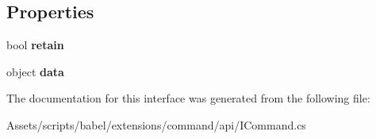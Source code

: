 \subsection*{Properties}
\begin{DoxyCompactItemize}
\item 
\hypertarget{interfacebabel_1_1extensions_1_1command_1_1api_1_1_i_command_a2ff6a94dcc8af6d3b35b7731041ae9e4}{bool {\bfseries retain}}\label{interfacebabel_1_1extensions_1_1command_1_1api_1_1_i_command_a2ff6a94dcc8af6d3b35b7731041ae9e4}

\item 
\hypertarget{interfacebabel_1_1extensions_1_1command_1_1api_1_1_i_command_a3ac3a3f989ebc5243b8f14fb387dff36}{object {\bfseries data}}\label{interfacebabel_1_1extensions_1_1command_1_1api_1_1_i_command_a3ac3a3f989ebc5243b8f14fb387dff36}

\end{DoxyCompactItemize}


The documentation for this interface was generated from the following file\-:\begin{DoxyCompactItemize}
\item 
Assets/scripts/babel/extensions/command/api/I\-Command.\-cs\end{DoxyCompactItemize}
